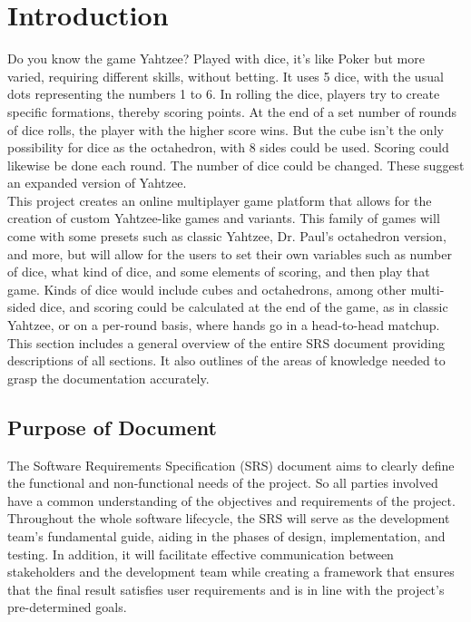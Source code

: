 \section{Introduction}

Do you know the game Yahtzee? Played with dice, it's like Poker but more varied, requiring different skills, without betting. It uses 5 dice, with the usual dots representing the numbers 1 to 6. In rolling the dice, players try to create specific formations, thereby scoring points. At the end of a set number of rounds of dice rolls, the player with the higher score wins. But the cube isn't the only possibility for dice as the octahedron, with 8 sides could be used. Scoring could likewise be done each round. The number of dice could be changed. These suggest an expanded version of Yahtzee.\\

This project creates an online multiplayer game platform that allows for the creation of custom Yahtzee-like games and variants. This family of games will come with some presets such as classic Yahtzee, Dr. Paul's octahedron version, and more, but will allow for the users to set their own variables such as number of dice, what kind of dice, and some elements of scoring, and then play that game. Kinds of dice would include cubes and octahedrons, among other multi-sided dice, and scoring could be calculated at the end of the game, as in classic Yahtzee, or on a per-round basis, where hands go in a head-to-head matchup.\\

This section includes a general overview of the entire SRS document providing descriptions of all sections. It also outlines of the areas of knowledge needed to grasp the documentation accurately.

\subsection{Purpose of Document}

  
The Software Requirements Specification (SRS) document aims to clearly define the functional and non-functional needs of the project. So all parties involved have a common understanding of the objectives and requirements of the project. Throughout the whole software lifecycle, the SRS will serve as the development team's fundamental guide, aiding in the phases of design, implementation, and testing. In addition, it will facilitate effective communication between stakeholders and the development team while creating a framework that ensures that the final result satisfies user requirements and is in line with the project's pre-determined goals.

